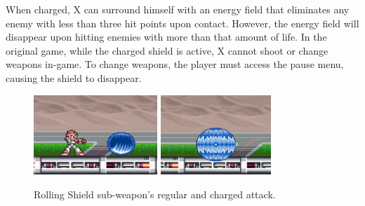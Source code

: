 When charged, X can surround himself with an energy field that eliminates any enemy with less than three hit points upon contact. However, the energy field will disappear upon hitting enemies with more than that amount of life. In the original game, while the charged shield is active, X cannot shoot or change weapons in-game. To change weapons, the player must access the pause menu, causing the shield to disappear.

\begin{figure}[htp]
	\centering
		\includegraphics[height=3cm]{figures/X1/weapons/Rolling_shield_1.jpg}	
		\includegraphics[height=3cm]{figures/X1/weapons/Rolling_shield_2.jpg}	
	\caption{Rolling Shield sub-weapon's regular and charged attack.}
\end{figure}

